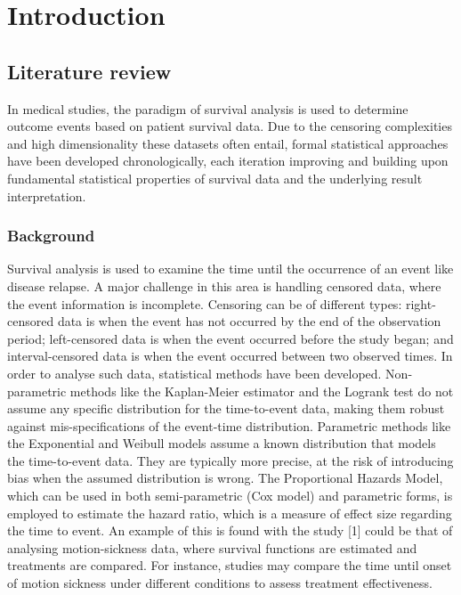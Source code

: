 \chapter{Introduction} %
\label{Chapter1} %

\noindent 
\section{Literature review}
\noindent
In medical studies, the paradigm of survival analysis is used to determine outcome events based on patient survival data. Due to the censoring complexities and high dimensionality these datasets often entail, formal statistical approaches have been developed  chronologically, each iteration improving and building upon fundamental statistical properties of survival data and the underlying result interpretation. 
\subsection{Background} 
\noindent
Survival analysis is used to examine the time until the occurrence of an event like disease relapse. A major challenge in this area is handling censored data, where the event information is incomplete. Censoring can be of different types: right-censored data is when the event has not occurred by the end of the observation period; left-censored data is when the event occurred before the study began; and interval-censored data is when the event occurred between two observed times. In order to analyse such data, statistical methods have been developed. Non-parametric methods like the Kaplan-Meier estimator and the Logrank test do not assume any specific distribution for the time-to-event data, making them robust against mis-specifications of the event-time distribution. Parametric methods like the Exponential and Weibull models assume a known distribution that models the time-to-event data. They are typically more precise, at the risk of introducing bias when the assumed distribution is wrong. The Proportional Hazards Model, which can be used in both semi-parametric (Cox model) and parametric forms, is employed to estimate the hazard ratio, which is a measure of effect size regarding the time to event. An example of this is found with the study [1] could be that of analysing motion-sickness data, where survival functions are estimated and treatments are compared. For instance, studies may compare the time until onset of motion sickness under different conditions to assess treatment effectiveness.

